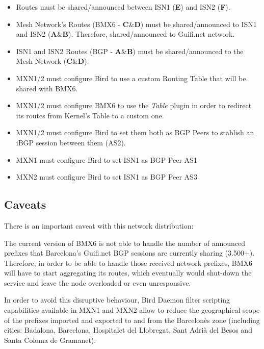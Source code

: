\begin{itemize}
    \item Routes must be shared/announced between ISN1 (\textbf{E}) and ISN2 (\textbf{F}).
    \item Mesh Network's Routes (BMX6 - \textbf{C}\&\textbf{D}) must be shared/announced to ISN1 and ISN2 (\textbf{A}\&\textbf{B}). Therefore, shared/announced to Guifi.net network.
    \item ISN1 and ISN2 Routes (BGP - \textbf{A}\&\textbf{B}) must be shared/announced to the Mesh Network (\textbf{C}\&\textbf{D}).
    \item MXN1/2 must configure Bird to use a custom Routing Table that will be shared with BMX6.
    \item MXN1/2 must configure BMX6 to use the \textit{Table} plugin in order to redirect its routes from Kernel's Table to a custom one.
    \item MXN1/2 must configure Bird to set them both as BGP Peers to stablish an iBGP session between them (AS2).
    \item MXN1 must configure Bird to set ISN1 as BGP Peer AS1
    \item MXN2 must configure Bird to set ISN1 as BGP Peer AS3
\end{itemize}

\subsection{Caveats}
There is an important caveat with this network distribution:

The current version of BMX6 is not able to handle the number of announced prefixes that Barcelona's Guifi.net BGP sessions are currently sharing (3.500+). Therefore, in order to be able to handle those received network prefixes, BMX6 will have to start aggregating its routes, which eventually would shut-down the service and leave the node overloaded or even unresponsive.

In order to avoid this disruptive behaviour, Bird Daemon filter scripting capabilities available in MXN1 and MXN2 allow to reduce the geographical scope of the prefixes imported and exported to and from the Barcelon\`{e}s zone (including cities: Badalona, Barcelona, Hospitalet del Llobregat, Sant Adri\`{a} del Besos and Santa Coloma de Gramanet).

